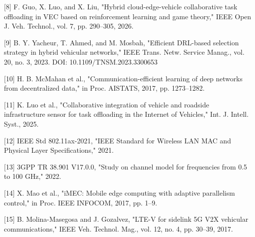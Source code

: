 \documentclass[journal,10pt,twocolumn]{IEEEtran}
\begin{document}
{[}8{]} F. Guo, X. Luo, and X. Liu, "Hybrid cloud-edge-vehicle
collaborative task offloading in VEC based on reinforcement learning and
game theory," IEEE Open J. Veh. Technol., vol. 7, pp. 290--305, 2026.

{[}9{]} B. Y. Yacheur, T. Ahmed, and M. Mosbah, "Efficient DRL-based
selection strategy in hybrid vehicular networks," IEEE Trans. Netw.
Service Manag., vol. 20, no. 3, 2023. DOI: 10.1109/TNSM.2023.3300653

{[}10{]} H. B. McMahan et al., "Communication-efficient learning of deep
networks from decentralized data," in Proc. AISTATS, 2017, pp.
1273--1282.

{[}11{]} K. Luo et al., "Collaborative integration of vehicle and
roadside infrastructure sensor for task offloading in the Internet of
Vehicles," Int. J. Intell. Syst., 2025.

{[}12{]} IEEE Std 802.11ax-2021, "IEEE Standard for Wireless LAN MAC and
Physical Layer Specifications," 2021.

{[}13{]} 3GPP TR 38.901 V17.0.0, "Study on channel model for frequencies
from 0.5 to 100 GHz," 2022.

{[}14{]} X. Mao et al., "iMEC: Mobile edge computing with adaptive
parallelism control," in Proc. IEEE INFOCOM, 2017, pp. 1--9.

{[}15{]} B. Molina-Masegosa and J. Gozalvez, "LTE-V for sidelink 5G V2X
vehicular communications," IEEE Veh. Technol. Mag., vol. 12, no. 4, pp.
30--39, 2017.
\end{document}
